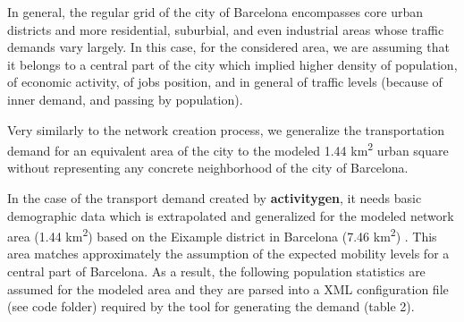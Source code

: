 \documentclass[11pt]{article}
\begin{document}
In general, the regular grid of the city of Barcelona encompasses core urban districts and more residential, suburbial, and even industrial areas whose traffic demands vary largely. In this case, for the considered area, we are assuming that it belongs to a central part of the city which implied higher density of population, of economic activity, of jobs position, and in general of traffic levels (because of inner demand, and passing by population).

Very similarly to the network creation process, we generalize the transportation demand for an equivalent area of the city to the modeled 1.44 km\textsuperscript{2} urban square without representing any concrete neighborhood of the city of Barcelona.

In the case of the transport demand created by \textbf{activitygen}, it needs basic demographic data which is extrapolated and generalized for the modeled network area (1.44 km\textsuperscript{2}) based on the Eixample district in Barcelona (7.46 km\textsuperscript{2}) \citep{AjuntamentdeBarcelona2018, AreadeBarcelona.AutoritatdelTransportMetropolita2020, DepartamentdAnalisiOficinaMunicipaldeDades.AjuntamentdeBarcelona2020}. This area matches approximately the assumption of the expected mobility levels for a central part of Barcelona. As a result, the following population statistics are assumed for the modeled area and they are parsed into a XML configuration file (see code folder) required by the tool for generating the demand (table 2).

\begin{table}[h!]
\centering
\caption{Population statistics for the modeled area used in ACTIVITYGEN}
\label{tab:pop-stats}
\end{table}
\end{document}
